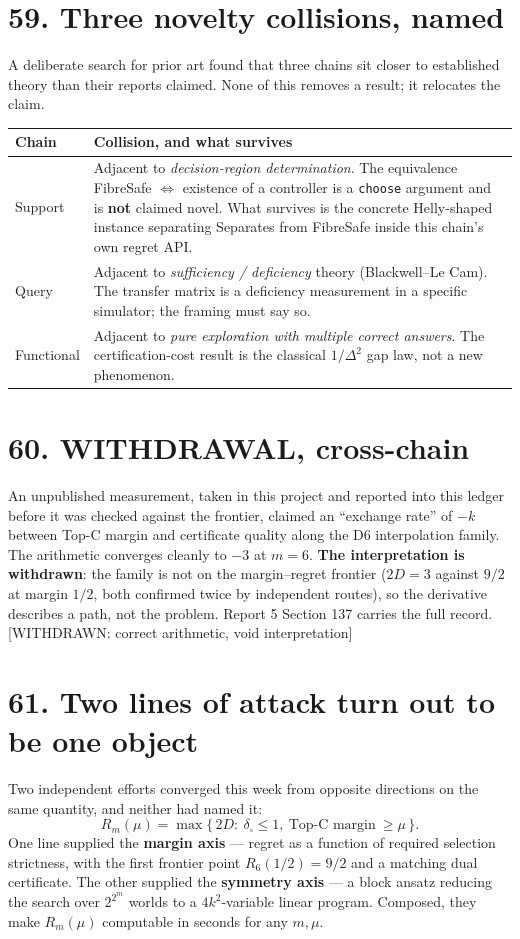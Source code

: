 \documentclass[9pt,twocolumn]{article}
\newcommand{\eclass}[1]{\textsf{[#1]}}
\renewcommand{\_}{\CIGunderscore\allowbreak}
\begin{document}
\section*{59. Three novelty collisions, named}
A deliberate search for prior art found that three chains sit closer to established theory than their reports claimed. None of this removes a result; it relocates the claim.
\begin{center}\scriptsize
\begin{tabularx}{0.98\columnwidth}{>{\raggedright\arraybackslash}p{}X}
\toprule
Chain & Collision, and what survives\\
\midrule
Support & Adjacent to \emph{decision-region determination}. The equivalence \textsf{FibreSafe} $\iff$ existence of a controller is a \texttt{choose} argument and is \textbf{not} claimed novel. What survives is the concrete Helly-shaped instance separating \textsf{Separates} from \textsf{FibreSafe} inside this chain's own regret API.\\
Query & Adjacent to \emph{sufficiency / deficiency} theory (Blackwell--Le Cam). The transfer matrix is a deficiency measurement in a specific simulator; the framing must say so.\\
Functional & Adjacent to \emph{pure exploration with multiple correct answers}. The certification-cost result is the classical $1/\Delta^2$ gap law, not a new phenomenon.\\
\bottomrule
\end{tabularx}
\end{center}

\section*{60. WITHDRAWAL, cross-chain}
An unpublished measurement, taken in this project and reported into this ledger before it was checked against the frontier, claimed an ``exchange rate'' of $-k$ between Top-C margin and certificate quality along the D6 interpolation family. The arithmetic converges cleanly to $-3$ at $m=6$. \textbf{The interpretation is withdrawn}: the family is not on the margin--regret frontier ($2D=3$ against $9/2$ at margin $1/2$, both confirmed twice by independent routes), so the derivative describes a path, not the problem. Report 5 Section 137 carries the full record. \eclass{WITHDRAWN: correct arithmetic, void interpretation}

\section*{61. Two lines of attack turn out to be one object}
Two independent efforts converged this week from opposite directions on the same quantity, and neither had named it:
\[R_m(\mu)=\max\{\,2D:\ \delta_\square\le1,\ \text{Top-C margin}\ \ge\mu\,\}.\]
One line supplied the \textbf{margin axis} --- regret as a function of required selection strictness, with the first frontier point $R_6(1/2)=9/2$ and a matching dual certificate. The other supplied the \textbf{symmetry axis} --- a block ansatz reducing the search over $2^{2^m}$ worlds to a $4k^2$-variable linear program. Composed, they make $R_m(\mu)$ computable in seconds for any $m,\mu$.
\end{document}
